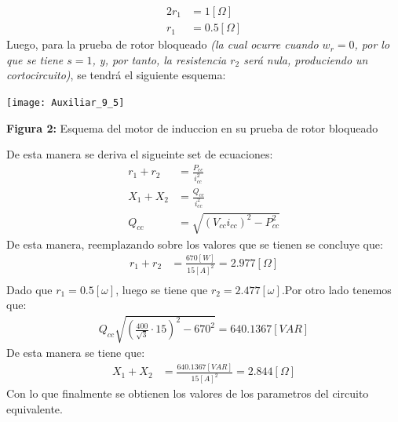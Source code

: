 \documentclass[
  11pt,
  letterpaper,
   addpoints,
   answers
  ]{exam}
\begin{document}
\begin{questions}
\begin{solution}
\begin{align}
            2r_{1} &= 1[\Omega]\\
            r_{1} &= 0.5[\Omega]
        \end{align}
        Luego, para la prueba de rotor bloqueado \textit{(la cual ocurre cuando \( w_r = 0 \), por lo que se tiene \( s = 1 \), 
        y, por tanto, la resistencia \( r_2 \) será nula, produciendo un cortocircuito)}, se tendrá el siguiente esquema:        
        \begin{center}
            \texttt{[image: Auxiliar\_9\_5]}
        \end{center}
        \begin{center}
            \textbf{Figura 2:} Esquema del motor de induccion en su prueba de rotor bloqueado
        \end{center}
        De esta manera se deriva el sigueinte set de ecuaciones:
        \begin{align}
            r_{1} + r_{2} &= \frac{P_{cc}}{i^{2}_{cc}}\\
            X_{1} + X_{2} &= \frac{Q_{cc}}{i^{2}_{cc}}\\
            Q_{cc} &= \sqrt{(V_{cc}i_{cc})^{2} - P_{cc}^{2}}
        \end{align}
        De esta manera, reemplazando sobre los valores que se tienen se concluye que:
        \begin{align}
            r_{1} + r_{2} &= \frac{670[W]}{15[A]^{2}} = 2.977[\Omega]\\
        \end{align}
        Dado que $r_{1} = 0.5[\omega]$, luego se tiene que $r_{2} = 2.477[\omega]$.Por otro lado tenemos que:
        \begin{align}
            Q_{cc} \sqrt{ \left(\frac{400}{\sqrt{3}} \cdot 15 \right)^{2} - 670^{2}} = 640.1367[VAR]
        \end{align}
        De esta manera se tiene que:
        \begin{align}
            X_{1} + X_{2} &= \frac{640.1367[VAR]}{15[A]^{2}} = 2.844[\Omega]
        \end{align}
        Con lo que finalmente se obtienen los valores de los parametros del circuito equivalente.

\end{solution}
\end{questions}
\end{document}
